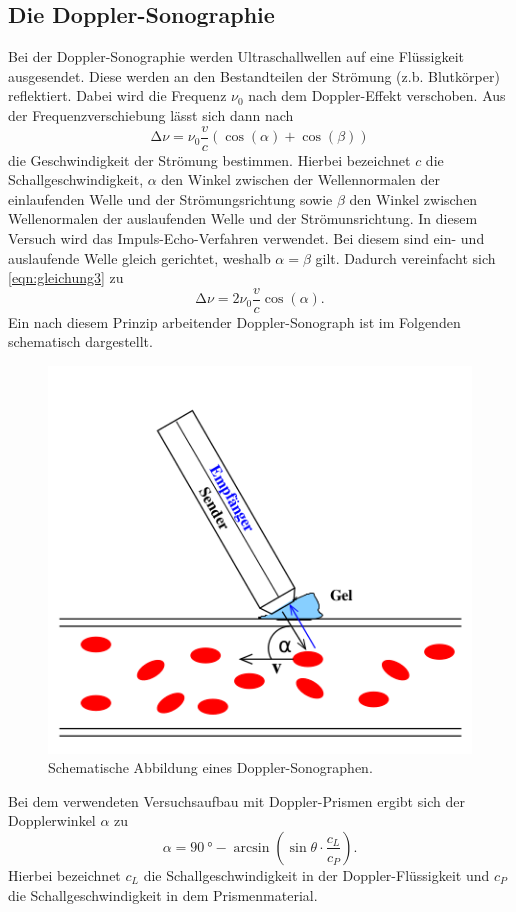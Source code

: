 \subsection{Die Doppler-Sonographie}
Bei der Doppler-Sonographie werden Ultraschallwellen auf eine Flüssigkeit
ausgesendet. Diese werden an den Bestandteilen der Strömung (z.b. Blutkörper)
reflektiert. Dabei wird die Frequenz $\nu_0$ nach dem Doppler-Effekt verschoben.
Aus der Frequenzverschiebung lässt sich dann nach
\begin{equation}
\increment \nu = \nu_0 \frac{v}{c}(\cos(\alpha) + \cos(\beta))
\label{eqn:gleichung3}
\end{equation}
die Geschwindigkeit der Strömung bestimmen.
Hierbei bezeichnet $c$ die Schallgeschwindigkeit, $\alpha$ den Winkel zwischen der
Wellennormalen der einlaufenden Welle und der Strömungsrichtung sowie $\beta$ den
Winkel zwischen Wellenormalen der auslaufenden Welle und der Strömunsrichtung.
In diesem Versuch wird das Impuls-Echo-Verfahren verwendet. Bei diesem sind ein-
und auslaufende Welle gleich gerichtet, weshalb $\alpha = \beta$ gilt. Dadurch
vereinfacht sich \eqref{eqn:gleichung3} zu
\begin{equation*}
\increment \nu = 2 \nu_0 \frac{v}{c} \cos(\alpha).
\end{equation*}
Ein nach diesem Prinzip arbeitender Doppler-Sonograph ist im Folgenden schematisch
dargestellt.
\begin{figure}[H]
  \centering
  \includegraphics[scale=0.5]{content/dopplersonograph.png}
  \caption{Schematische Abbildung eines Doppler-Sonographen.}
  \label{fig:dopplersonographtheorie}
\end{figure}
\noindent
Bei dem verwendeten Versuchsaufbau mit Doppler-Prismen ergibt sich der Dopplerwinkel $\alpha$
zu
\begin{equation}
  \alpha = \SI{90}{\degree} - \arcsin( \sin{\theta} \cdot \frac{c_L}{c_P}).
  \label{eqn:gleichung5theorie}
\end{equation}
Hierbei bezeichnet $c_L$ die Schallgeschwindigkeit in der Doppler-Flüssigkeit
und $c_P$ die Schallgeschwindigkeit in dem Prismenmaterial.


